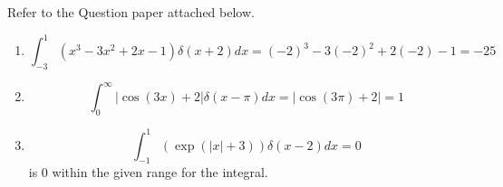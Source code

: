 \documentclass[addpoints]{exam}
\begin{document}
\begin{questions}
    \pagebreak
    \question Refer to the Question paper attached below.
    \begin{solution}
        \begin{enumerate}
            \item \[\int_{-3}^1 \left(x^3 - 3x^2 + 2x - 1\right)\delta(x+2)dx = (-2)^3 - 3(-2)^2 + 2(-2) - 1 = -25\]
            \item \[\int_{0}^\infty |\cos(3x) + 2|\delta(x-\pi)dx = |\cos(3\pi) + 2| = 1\]

                  \item\[\int_{-1}^1 \left(\exp(|x|+3)\right)\delta(x-2)dx = 0\]
                  is 0 within the given range for the integral.
        \end{enumerate}
    \end{solution}


\end{questions}
\end{document}
